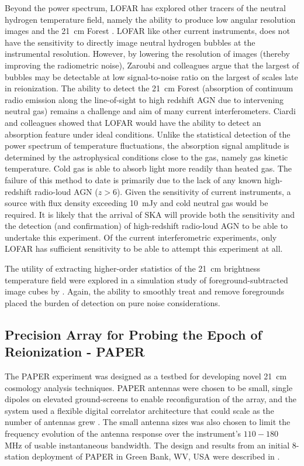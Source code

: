Beyond the power spectrum, LOFAR has explored other tracers of the neutral hydrogen temperature field, namely the ability to produce low angular resolution images \cite{2012MNRAS.425.2964Z} and the 21~cm Forest \cite{2013MNRAS.428.1755C}. LOFAR like other current instruments, does not have the sensitivity to directly image neutral hydrogen bubbles at the instrumental resolution. However, by lowering the resolution of images (thereby improving the radiometric noise), Zaroubi and colleagues argue that the largest of bubbles may be detectable at low signal-to-noise ratio on the largest of scales late in reionization. The ability to detect the 21~cm Forest (absorption of continuum radio emission along the line-of-sight to high redshift AGN due to intervening neutral gas) remains a challenge and aim of many current interferometers. Ciardi and colleagues showed that LOFAR would have the ability to detect an absorption feature under ideal conditions. Unlike the statistical detection of the power spectrum of temperature fluctuations, the absorption signal amplitude is determined by the astrophysical conditions close to the gas, namely gas kinetic temperature. Cold gas is able to absorb light more readily than heated gas. The failure of this method to date is primarily due to the lack of any known high-redshift radio-loud AGN ($z>6$). Given the sensitivity of current instruments, a source with flux density exceeding 10~mJy and cold neutral gas would be required. It is likely that the arrival of SKA will provide both the sensitivity and the detection (and confirmation) of high-redshift radio-loud AGN to be able to undertake this experiment. Of the current interferometric experiments, only LOFAR has sufficient sensitivity to be able to attempt this experiment at all.

The utility of extracting higher-order statistics of the 21~cm brightness temperature field were explored in a simulation study of foreground-subtracted image cubes by \cite{2009MNRAS.393.1449H}. Again, the ability to smoothly treat and remove foregrounds placed the burden of detection on pure noise considerations.

\subsection{Precision Array for Probing the Epoch of Reionization - PAPER}
The PAPER experiment was designed as a testbed for developing novel 21~cm cosmology analysis techniques.  PAPER antennas were chosen to be small, single dipoles on elevated ground-screens to enable reconfiguration of the array, and the system used a flexible digital correlator architecture that could scale as the number of antennas grew \cite{parsons08}.  The small antenna sizes was also chosen to limit the frequency evolution of the antenna response over the instrument's $110-180$\, MHz of usable instantaneous bandwidth.  The design and results from an initial 8-station deployment of PAPER in Green Bank, WV, USA were described in \cite{parsons10}.  

